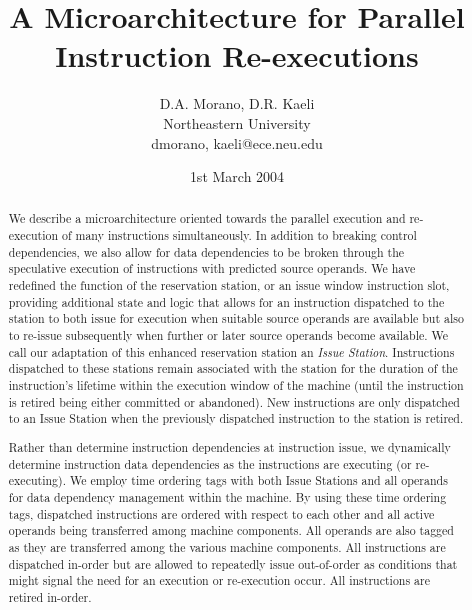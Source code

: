 \documentclass[10pt,dvips]{article}
\begin{document}
%
%
\title{A Microarchitecture for Parallel Instruction Re-executions}
%
%
\author{
D.A. Morano, D.R. Kaeli\\
Northeastern University\\
{dmorano, kaeli}@ece.neu.edu
}
%
%
\date{1st March 2004}
%
\maketitle
%
%
%
\begin{abstract}
%
We describe a microarchitecture oriented towards
the parallel execution and re-execution of many instructions
simultaneously.
In addition to breaking control dependencies, we also allow
for data dependencies to be broken through the speculative
execution of instructions with predicted source operands.
We have redefined the function of the reservation station, or an
issue window instruction slot, providing additional
state and logic that
allows for an instruction dispatched to the station to both
issue for execution when suitable source operands are available
but also to re-issue subsequently when further or later source
operands become available.  We call our adaptation of
this enhanced reservation station an \textit{Issue Station}.
Instructions dispatched to these stations remain associated
with the station for the duration of the instruction's lifetime
within the execution window of the machine (until the instruction
is retired being either committed or abandoned).
New instructions are only dispatched to an Issue Station when the
previously dispatched instruction to the station is retired.

Rather than determine instruction dependencies at 
instruction issue, we dynamically determine instruction data
dependencies as the instructions are executing (or re-executing).
We employ time ordering tags with both Issue Stations and
all operands for data dependency management within the machine.
By using these time ordering tags, dispatched instructions
are ordered with respect to each other and all active operands
being transferred among machine components.  All operands
are also tagged as they are transferred among the various machine 
components.  All instructions are dispatched in-order but are
allowed to repeatedly issue out-of-order as conditions that
might signal the need for an execution or re-execution occur.
All instructions are retired in-order.


\end{abstract}
\end{document}

